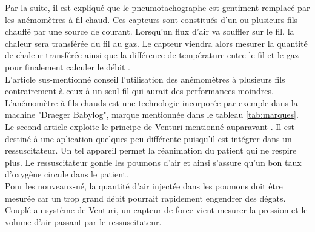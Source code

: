 Par la suite, il est expliqué que le pneumotachographe est gentiment remplacé par les anémomètres à fil chaud. Ces capteurs sont 
constitués d'un ou plusieurs fils chauffé par une source de courant. Lorsqu'un flux d'air va souffler sur le fil, la chaleur sera 
transférée du fil au gaz. Le capteur viendra alors mesurer la quantité de chaleur transférée ainsi que la différence de température entre 
le fil et le gaz pour finalement calculer le débit \cite{oberg_biomedical_2011}. \\
L'article sus-mentionné conseil l'utilisation des anémomètres à plusieurs fils contrairement à ceux à un seul fil qui aurait des performances 
moindres. 
L'anémomètre à fils chauds est une technologie incorporée par exemple dans la machine "Draeger Babylog", marque mentionnée dans le tableau \ref{tab:marques}. \\

Le second article exploite le principe de Venturi mentionné auparavant \cite{jacq_ultra-low_2011}. Il est destiné à une aplication 
quelques peu différente puisqu'il est  intégrer dans un ressuscitateur. Un tel appareil permet la réanimation du patient qui ne respire 
plus. Le ressuscitateur gonfle les poumons d'air et ainsi s'assure qu'un bon taux d'oxygène circule dans le patient. \\
Pour les nouveaux-né, la quantité d'air injectée dans les poumons doit être mesurée car un trop grand débit pourrait rapidement engendrer 
des dégats. \\
Couplé au système de Venturi, un capteur de force vient mesurer la pression et le volume d'air passant par le ressuscitateur. \\

